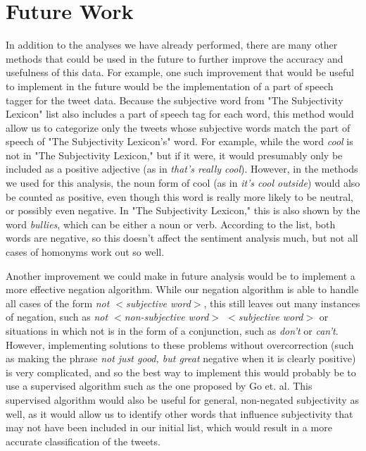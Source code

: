 \documentclass[11pt]{article}
\begin{document}
\section{Future Work}
In addition to the analyses we have already performed, there are many other methods that could be used in the future to further improve the accuracy and usefulness of this data.  For example, one such improvement that would be useful to implement in the future would be the implementation of a part of speech tagger for the tweet data.  Because the subjective word from "The Subjectivity Lexicon" list also includes a part of speech tag for each word, this method would allow us to categorize only the tweets whose subjective words match the part of speech of "The Subjectivity Lexicon's" word.  For example, while the word \textit{cool} is not in "The Subjectivity Lexicon," but if it were, it would presumably only be included as a positive adjective (as in \textit{that's really cool}).  However, in the methods we used for this analysis, the noun form of cool (as in \textit{it's cool outside}) would also be counted as positive, even though this word is really more likely to be neutral, or possibly even negative.  In "The Subjectivity Lexicon," this is also shown by the word \textit{bullies}, which can be either a noun or verb.  According to the list, both words are negative, so this doesn't affect the sentiment analysis much, but not all cases of homonyms work out so well.

Another improvement we could make in future analysis would be to implement a more effective negation algorithm.  While our negation algorithm is able to handle all cases of the form \textit{not $<$subjective word$>$}, this still leaves out many instances of negation, such as \textit{not $<$non-subjective word$>$ $<$subjective word$>$} or situations in which not is in the form of a conjunction, such as \textit{don't} or \textit{can't}.  However, implementing solutions to these problems without overcorrection (such as making the phrase \textit{not just good, but great} negative when it is clearly positive) is very complicated, and so the best way to implement this would probably be to use a supervised algorithm such as the one proposed by Go et. al.\cite{go-distant}   This supervised algorithm would also be useful for general, non-negated subjectivity as well, as it would allow us to identify other words that influence subjectivity that may not have been included in our initial list, which would result in a more accurate classification of the tweets.
\end{document}
